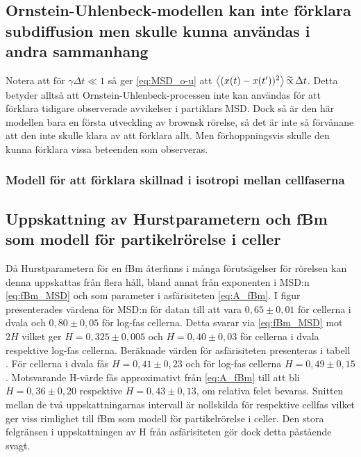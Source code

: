 \subsection{Ornstein-Uhlenbeck-modellen kan inte förklara subdiffusion men skulle kunna användas i andra sammanhang}

Notera att för $\gamma\Delta{t}\ll 1$ så ger \eqref{eq:MSD_o-u} att 
$\ev{(x(t)-x(t') )^2}\widetilde{\propto}\,\Delta{t}$. Detta betyder alltså att Ornstein-Uhlenbeck-processen inte kan användas för att förklara tidigare observerade avvikelser\cite{Hofling&Franosch2013} i partiklars MSD. Dock så är den här modellen bara en första utveckling av brownsk rörelse, så det är inte så förvånane att den inte skulle klara av att förklara allt. Men förhoppningsvis skulle den kunna förklara vissa beteenden som observeras. 


\subsubsection{Modell för att förklara skillnad i isotropi mellan cellfaserna}



\subsection{Uppskattning av Hurstparametern och fBm som modell för partikelrörelse i celler}

Då Hurstparametern för en fBm återfinns i många förutsägelser för rörelsen kan denna uppskattas från flera håll, bland annat från exponenten i MSD:n \eqref{eq:fBm_MSD} och som parameter i asfärisiteten \eqref{eq:A_fBm}. 
I figur  presenterades värdena för MSD:n för datan till att vara $0,65\pm0,01$ för cellerna i dvala och $0,80\pm0,05$ för log-fas cellerna. Detta svarar via \eqref{eq:fBm_MSD} mot $2H$ vilket ger $H=0,325\pm0,005$ och $H=0,40\pm0,03$ för cellerna i dvala respektive log-fas cellerna.
Beräknade värden för asfärisiteten presenteras i tabell . För cellerna i dvala fås $H=0,41\pm 0,23$ och för log-fas cellerna $H=0,49\pm 0,15$. Motsvarande H-värde fås approximativt från \eqref{eq:A_fBm} till att bli $H=0,36\pm0,20$ respektive $H=0,43\pm0,13$, om relativa felet bevaras. Snitten mellan de två uppskattningarnas intervall är nollskilda för respektive cellfas vilket ger viss rimlighet till fBm som modell för partikelrörelse i celler. Den stora felgränsen i uppskattningen av H från asfärisiteten gör dock detta påstående svagt.

